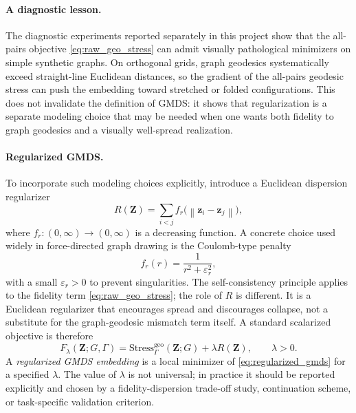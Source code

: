 \documentclass[twoside,11pt]{article}
\newcommand{\bz}{\mathbf{z}}
\newcommand{\bZ}{\mathbf{Z}}
\newcommand{\norm}[1]{\left\|#1\right\|}
\newcommand{\Stress}{\mathrm{Stress}}
\begin{document}
\paragraph{A diagnostic lesson.}
The diagnostic experiments reported separately in this project show that the
all-pairs objective \cref{eq:raw_geo_stress} can admit visually pathological
minimizers on simple synthetic graphs.  On orthogonal grids, graph geodesics
systematically exceed straight-line Euclidean distances, so the gradient of the
all-pairs geodesic stress can push the embedding toward stretched or folded
configurations.  This does not invalidate the definition of GMDS: it shows that
regularization is a separate modeling choice that may be needed when one wants
both fidelity to graph geodesics and a visually well-spread realization.

\paragraph{Regularized GMDS.}
To incorporate such modeling choices explicitly, introduce a Euclidean
dispersion regularizer
\begin{equation}
  R(\bZ) = \sum_{i < j} f_r\bigl(\norm{\bz_i - \bz_j}\bigr),
  \label{eq:repulsive_regularizer}
\end{equation}
where $f_r : (0,\infty) \to (0,\infty)$ is a decreasing function.  A
concrete choice used widely in force-directed graph drawing is the Coulomb-type
penalty
\begin{equation}
  f_r(r) = \frac{1}{r^2 + \varepsilon_r^2},
  \label{eq:coulomb_regularizer}
\end{equation}
with a small $\varepsilon_r > 0$ to prevent singularities.  The
self-consistency principle applies to the fidelity term
\cref{eq:raw_geo_stress}; the role of $R$ is different.  It is a Euclidean
regularizer that encourages spread and discourages collapse, not a substitute
for the graph-geodesic mismatch term itself.  A standard scalarized objective
is therefore
\begin{equation}
  F_\lambda(\bZ; G,\Gamma)
  = \Stress^{\mathrm{geo}}_{\Gamma}(\bZ; G) + \lambda R(\bZ),
  \qquad \lambda > 0.
  \label{eq:regularized_gmds}
\end{equation}
A \emph{regularized GMDS embedding} is a local minimizer of
\cref{eq:regularized_gmds} for a specified $\lambda$.  The value of
$\lambda$ is not universal; in practice it should be reported explicitly and
chosen by a fidelity-dispersion trade-off study, continuation scheme, or
task-specific validation criterion.
\end{document}
